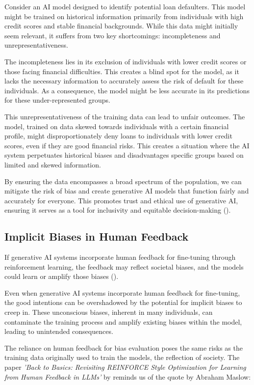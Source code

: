 \documentclass[12pt]{article}
\begin{document}
Consider an AI model designed to identify potential loan defaulters. This model might be trained on historical information primarily from individuals with high credit scores and stable financial backgrounds. While this data might initially seem relevant, it suffers from two key shortcomings: incompleteness and unrepresentativeness.

The incompleteness lies in its exclusion of individuals with lower credit scores or those facing financial difficulties. This creates a blind spot for the model, as it lacks the necessary information to accurately assess the risk of default for these individuals. As a consequence, the model might be less accurate in its predictions for these under-represented groups.

This unrepresentativeness of the training data can lead to unfair outcomes. The model, trained on data skewed towards individuals with a certain financial profile, might disproportionately deny loans to individuals with lower credit scores, even if they are good financial risks. This creates a situation where the AI system perpetuates historical biases and disadvantages specific groups based on limited and skewed information.

By ensuring the data encompasses a broad spectrum of the population, we can mitigate the risk of bias and create generative AI models that function fairly and accurately for everyone. This promotes trust and ethical use of generative AI, ensuring it serves as a tool for inclusivity and equitable decision-making (\cite{marwala-2023}).

\subsection{Implicit Biases in Human Feedback}

If generative AI systems incorporate human feedback for fine-tuning through reinforcement learning, the feedback may reflect societal biases, and the models could learn or amplify those biases (\cite{bill-2023}). 

Even when generative AI systems incorporate human feedback for fine-tuning, the good intentions can be overshadowed by the potential for implicit biases to creep in. These unconscious biases, inherent in many individuals, can contaminate the training process and amplify existing biases within the model, leading to unintended consequences.

The reliance on human feedback for bias evaluation poses the same risks as the training data originally used to train the models, the reflection of society. The paper \textit{'Back to Basics: Revisiting REINFORCE Style Optimization for Learning from Human Feedback in LLMs'} by \cite{ahmadian-2024} reminds us of the quote by Abraham Maslow:
\end{document}
